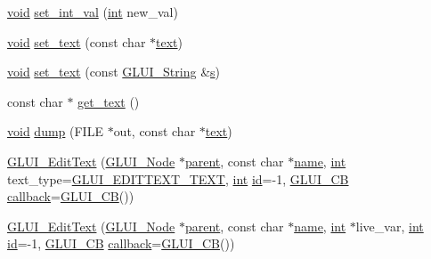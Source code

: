 \begin{DoxyCompactItemize}
\item 
\hyperlink{wglext_8h_a9e6b7f1933461ef318bb000d6bd13b83}{void} \hyperlink{class_g_l_u_i___edit_text_a230980562d1c49166c7600f1771669bd}{set\+\_\+int\+\_\+val} (\hyperlink{wglext_8h_a500a82aecba06f4550f6849b8099ca21}{int} new\+\_\+val)
\item 
\hyperlink{wglext_8h_a9e6b7f1933461ef318bb000d6bd13b83}{void} \hyperlink{class_g_l_u_i___edit_text_aa283908f42990f6056298d6381cc19a7}{set\+\_\+text} (const char $\ast$\hyperlink{class_g_l_u_i___control_af0d60e9736f4dbc34e9a536e75876d72}{text})
\item 
\hyperlink{wglext_8h_a9e6b7f1933461ef318bb000d6bd13b83}{void} \hyperlink{class_g_l_u_i___edit_text_a0f60b8b2a59ecf51b145187483b8deb2}{set\+\_\+text} (const \hyperlink{glui_8h_aada824856f7bcf29794719981ebd8f60}{G\+L\+U\+I\+\_\+\+String} \&\hyperlink{glext_8h_a4af680a6c683f88ed67b76f207f2e6e4}{s})
\item 
const char $\ast$ \hyperlink{class_g_l_u_i___edit_text_a621ba269343beeba0346439a43e5e355}{get\+\_\+text} ()
\item 
\hyperlink{wglext_8h_a9e6b7f1933461ef318bb000d6bd13b83}{void} \hyperlink{class_g_l_u_i___edit_text_a8c553db0ecb0814a3db0da5bcf630d58}{dump} (F\+I\+L\+E $\ast$out, const char $\ast$\hyperlink{class_g_l_u_i___control_af0d60e9736f4dbc34e9a536e75876d72}{text})
\item 
\hyperlink{class_g_l_u_i___edit_text_af99784896490989539ef7638a7fd4e12}{G\+L\+U\+I\+\_\+\+Edit\+Text} (\hyperlink{class_g_l_u_i___node}{G\+L\+U\+I\+\_\+\+Node} $\ast$\hyperlink{class_g_l_u_i___node_a8ed65d447784f6f88bd3e2e2bcac6cdb}{parent}, const char $\ast$\hyperlink{glext_8h_ad977737dfc9a274a62741b9500c49a32}{name}, \hyperlink{wglext_8h_a500a82aecba06f4550f6849b8099ca21}{int} text\+\_\+type=\hyperlink{glui_8h_a5e7e137e5f35f2859b135d8924719d27}{G\+L\+U\+I\+\_\+\+E\+D\+I\+T\+T\+E\+X\+T\+\_\+\+T\+E\+X\+T}, \hyperlink{wglext_8h_a500a82aecba06f4550f6849b8099ca21}{int} \hyperlink{glext_8h_a58c2a664503e14ffb8f21012aabff3e9}{id}=-\/1, \hyperlink{class_g_l_u_i___c_b}{G\+L\+U\+I\+\_\+\+C\+B} \hyperlink{class_g_l_u_i___control_a96060fe0cc6d537e736dd6eef78e24ab}{callback}=\hyperlink{class_g_l_u_i___c_b}{G\+L\+U\+I\+\_\+\+C\+B}())
\item 
\hyperlink{class_g_l_u_i___edit_text_acde777046eb65672c70c51b5728e7c3f}{G\+L\+U\+I\+\_\+\+Edit\+Text} (\hyperlink{class_g_l_u_i___node}{G\+L\+U\+I\+\_\+\+Node} $\ast$\hyperlink{class_g_l_u_i___node_a8ed65d447784f6f88bd3e2e2bcac6cdb}{parent}, const char $\ast$\hyperlink{glext_8h_ad977737dfc9a274a62741b9500c49a32}{name}, \hyperlink{wglext_8h_a500a82aecba06f4550f6849b8099ca21}{int} $\ast$live\+\_\+var, \hyperlink{wglext_8h_a500a82aecba06f4550f6849b8099ca21}{int} \hyperlink{glext_8h_a58c2a664503e14ffb8f21012aabff3e9}{id}=-\/1, \hyperlink{class_g_l_u_i___c_b}{G\+L\+U\+I\+\_\+\+C\+B} \hyperlink{class_g_l_u_i___control_a96060fe0cc6d537e736dd6eef78e24ab}{callback}=\hyperlink{class_g_l_u_i___c_b}{G\+L\+U\+I\+\_\+\+C\+B}())

\end{DoxyCompactItemize}
